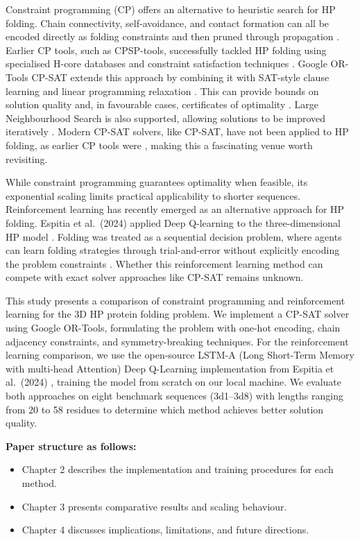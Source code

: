 \documentclass[12pt, oneside, openany]{book}
\theoremstyle{plain}
\theoremstyle{definition}
\begin{document}
Constraint programming (CP) offers an alternative to heuristic search for HP folding. Chain connectivity, self-avoidance, and contact formation can all be encoded directly as folding constraints and then pruned through propagation \cite{Barták2003}. Earlier CP tools, such as CPSP-tools, successfully tackled HP folding using specialised H-core databases and constraint satisfaction techniques \cite{CPSP2009}. Google OR-Tools CP-SAT extends this approach by combining it with SAT-style clause learning and linear programming relaxation \cite{Perron2023}. This can provide bounds on solution quality and, in favourable cases, certificates of optimality \cite{GoogleORTools}. Large Neighbourhood Search is also supported, allowing solutions to be improved iteratively \cite{Shaw1998}. Modern CP-SAT solvers, like CP-SAT, have not been applied to HP folding, as earlier CP tools were \cite{CPSP2009}, making this a fascinating venue worth revisiting.

While constraint programming guarantees optimality when feasible, its exponential scaling limits practical applicability to shorter sequences. Reinforcement learning has recently emerged as an alternative approach for HP folding. Espitia et al.\ (2024) applied Deep Q-learning to the three-dimensional HP model \cite{Espitia2024}. Folding was treated as a sequential decision problem, where agents can learn folding strategies through trial-and-error without explicitly encoding the problem constraints \cite{Yang2022}. Whether this reinforcement learning method can compete with exact solver approaches like CP-SAT remains unknown.

This study presents a comparison of constraint programming and reinforcement learning for the 3D HP protein folding problem. We implement a CP-SAT solver using Google OR-Tools, formulating the problem with one-hot encoding, chain adjacency constraints, and symmetry-breaking techniques. For the reinforcement learning comparison, we use the open-source LSTM-A (Long Short-Term Memory with multi-head Attention) Deep Q-Learning implementation from Espitia et al.\ (2024) \cite{Espitia2024}, training the model from scratch on our local machine. We evaluate both approaches on eight benchmark sequences (3d1--3d8) with lengths ranging from 20 to 58 residues to determine which method achieves better solution quality.

\textbf{Paper structure as follows:}
\begin{itemize}
    \item Chapter 2 describes the implementation and training procedures for each method.
    \item Chapter 3 presents comparative results and scaling behaviour.
    \item Chapter 4 discusses implications, limitations, and future directions.
\end{itemize}
\end{document}
